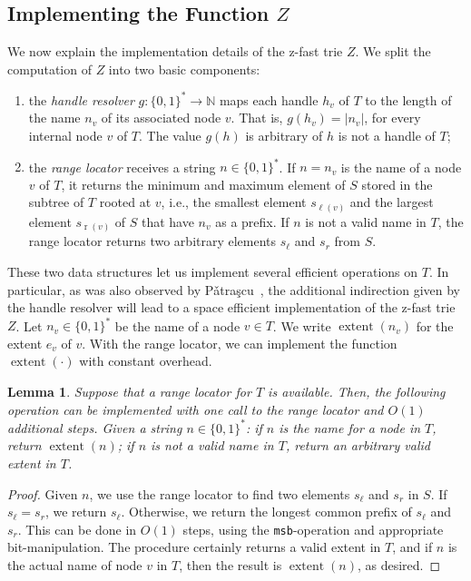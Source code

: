 \documentclass[a4paper,11pt]{article}
\newtheorem{lemma}[theorem]{Lemma}
\newcommand{\N}{\mathbb{N}}
\newcommand{\?}{\mskip1.5mu}
\newcommand{\Patrascu}{P\v{a}tra\c{s}cu\xspace}
\DeclareMathOperator{\lrange}{\ell}
\DeclareMathOperator{\rrange}{r}
\DeclareMathOperator{\extent}{extent}
\begin{document}
\subsection{Implementing the Function $Z$}

We now explain the implementation details of the
z-fast trie $Z$. We split the computation of $Z$ into
two basic components:
\begin{enumerate}
  \item the \emph{handle resolver} $g: \{0,1\}^* \rightarrow \N$ 
    maps each handle $h_v$ of $T$ to the length of the name 
    $n_v$ of its associated 
    node $v$. That is, $g(h_v) = |n_v|$, for every internal node $v$ 
    of $T$. The value $g(h)$ is arbitrary of $h$ is not a handle of $T$;
  \item the \emph{range locator} receives a string $n \in \{0, 1\}^*$.
  If $n = n_v$  is the name of a node $v$ of $T$, it returns the minimum and
  maximum element of $S$ stored in the subtree of $T$
  rooted at $v$, i.e., the smallest element $s_{\lrange(v)}$ and the 
  largest element $s_{\rrange(v)}$ of $S$ that
  have $n_v$ as a prefix. If $n$ is not a valid name in $T$, the range
  locator returns two arbitrary elements $s_\ell$ and $s_r$ from $S$.
\end{enumerate}

These two data structures let us implement several efficient operations
on $T$. In particular, as was also observed by 
\Patrascu~\cite{Patrascu10}, the additional indirection
given by the handle resolver will lead to a space efficient implementation
of the z-fast trie $Z$.
Let $n_v \in \{0, 1\}^*$ be the name of a node $v \in T$. We 
write $\extent(n_v)$ for the extent $e_v$ of $v$. With the range locator,
we can implement the function $\extent(\cdot)$ with constant overhead.

\begin{lemma}\label{lem:getextent}
Suppose that a range locator for $T$ is available. 
Then, the following operation can be implemented
with one call to the range locator and $O(1)$
additional steps.
Given a string $n \in \{0, 1\}^*$: 
if $n$ is the name for a node in $T$, return
$\extent(n)$; if $n$ is not a valid name
in $T$, return an arbitrary valid extent in $T$.
\end{lemma}

\begin{proof}
Given $n$, we use the range locator to find 
two elements $s_\ell$ and $s_r$ in $S$.
If $s_\ell = s_r$, we return $s_\ell$.
Otherwise, we return the longest common prefix of 
$s_\ell$ and $s_r$. This can be done in
$O(1)$ steps, using the \texttt{msb}-operation
and appropriate bit-manipulation.
The procedure certainly returns a valid extent
in $T$, and if $n$ is the actual name of node
$v$ in $T$, then the result is $\extent(n)$, 
as desired.
\end{proof}
\end{document}
